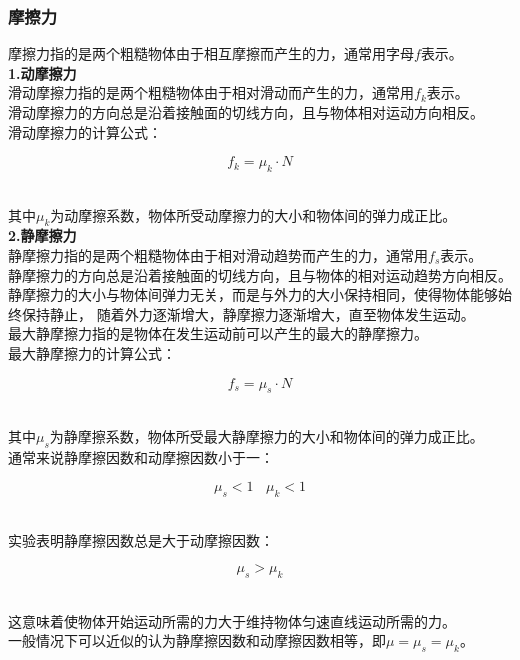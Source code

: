 \documentclass[UTF8]{ctexart}
\begin{document}
\newpage

\subsubsection{摩擦力}
    摩擦力指的是两个粗糙物体由于相互摩擦而产生的力，通常用字母$f$表示。\\[3mm]
    \textbf{1.动摩擦力}\\[3mm]
    滑动摩擦力指的是两个粗糙物体由于相对滑动而产生的力，通常用$f_k$表示。\\[3mm]
    滑动摩擦力的方向总是沿着接触面的切线方向，且与物体相对运动方向相反。\\[3mm]
    滑动摩擦力的计算公式：
    \begin{large}
        \begin{equation*}
            f_{k}=\mu_k\cdot N
        \end{equation*}
    \end{large}\\
    其中$\mu_k$为动摩擦系数，物体所受动摩擦力的大小和物体间的弹力成正比。\\[6mm]
    \textbf{2.静摩擦力}\\[2mm]
    静摩擦力指的是两个粗糙物体由于相对滑动趋势而产生的力，通常用$f_s$表示。\\[3mm]
    静摩擦力的方向总是沿着接触面的切线方向，且与物体的相对运动趋势方向相反。\\[3mm]
    静摩擦力的大小与物体间弹力无关，而是与外力的大小保持相同，使得物体能够始终保持静止，
    随着外力逐渐增大，静摩擦力逐渐增大，直至物体发生运动。\\[3mm]
    最大静摩擦力指的是物体在发生运动前可以产生的最大的静摩擦力。\\[3mm]
    最大静摩擦力的计算公式：
    \begin{large}
        \begin{equation*}
            f_{s}=\mu_{s}\cdot N
        \end{equation*}
    \end{large}\\
    其中$\mu_s$为静摩擦系数，物体所受最大静摩擦力的大小和物体间的弹力成正比。\\[6mm]
    通常来说静摩擦因数和动摩擦因数小于一：
    \begin{large}
        \begin{equation*}
            \mu_s<1~~~~\mu_k<1
        \end{equation*}
    \end{large}\\
    实验表明静摩擦因数总是大于动摩擦因数：
    \begin{large}
        \begin{equation*}
            \mu_s>\mu_k  
        \end{equation*}
    \end{large}\\
    这意味着使物体开始运动所需的力大于维持物体匀速直线运动所需的力。\\[3mm]
    一般情况下可以近似的认为静摩擦因数和动摩擦因数相等，即$\mu=\mu_s=\mu_k$。
\end{document}
